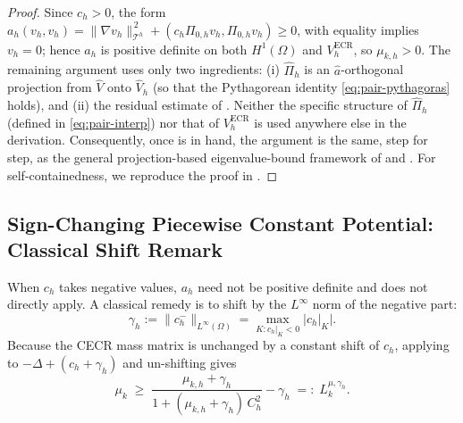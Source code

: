 \documentclass[11pt]{article}
\theoremstyle{plain}
\theoremstyle{definition}
\theoremstyle{remark}
\newcommand{\ECR}{\mathrm{ECR}}
\begin{document}
\begin{proof}
Since $c_h> 0$, the form
$a_h(v_h,v_h)=\|\nabla v_h\|_{\mathcal{T}^h}^{\,2}
+(c_h\Pi_{0,h}v_h,\Pi_{0,h}v_h)\ge 0$, with equality implies $v_h=0$;
hence $a_h$ is positive definite on both $H^1(\Omega)$ and
$V_h^{\ECR}$, so $\mu_{k,h} > 0$.
The remaining argument uses only two ingredients:
(i) $\widehat\Pi_h$ is an $\widehat a$-orthogonal projection
from $\widehat V$ onto $\widehat V_h$ (so that the Pythagorean
identity \eqref{eq:pair-pythagoras} holds), and (ii) the
residual estimate of . Neither
the specific structure of $\widehat\Pi_h$ (defined in
\eqref{eq:pair-interp}) nor that of $V_h^{\ECR}$ is used
anywhere else in the derivation. Consequently, once
 is in hand, the argument is
the same, step for step, as the general projection-based
eigenvalue-bound framework of \cite[Theorem~2.1]{Liu2015} and
\cite[Theorem~4.1]{liu2024guaranteed}. For self-containedness,
we reproduce the proof in .
\end{proof}

\subsection{Sign-Changing Piecewise Constant Potential: Classical Shift Remark}
\label{subsec:cecr-shift}

When $c_h$ takes negative values, $a_h$ need not be positive definite
and  does not directly apply.  A classical
remedy is to shift by the $L^\infty$ norm of the negative part:
\begin{equation}
\label{eq:gamma-h}
  \gamma_h := \|c_h^-\|_{L^\infty(\Omega)}
  = \max_{K : c_h|_K < 0} |c_h|_K|.
\end{equation}
Because the CECR mass matrix is unchanged by a constant shift of
$c_h$, applying  to
$-\Delta+(c_h+\gamma_h)$ and un-shifting gives
\begin{equation}
\label{eq:cecr-optimal-shift}
  \mu_k \;\ge\;
  \frac{\mu_{k,h}+\gamma_h}{1+(\mu_{k,h}+\gamma_h)\,C_h^2}-\gamma_h
  \;=:\; L_k^{\mu,\gamma_h}.
\end{equation}
\end{document}
